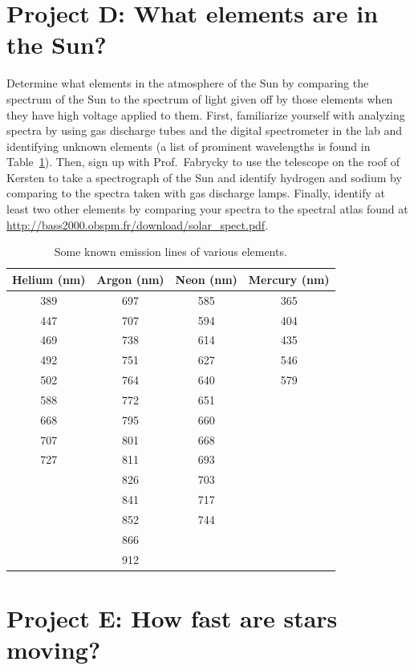 \section{Project D: What elements are in the Sun?}

Determine what elements in the atmosphere of the Sun by comparing the spectrum of the Sun to the spectrum of light given off by those elements when they have high voltage applied to them. First, familiarize yourself with analyzing spectra by using gas discharge tubes and the digital spectrometer in the lab and identifying unknown elements (a list of prominent wavelengths is found in Table\ \ref{sp:tab:emissions}). Then, sign up with Prof.\ Fabrycky to use the telescope on the roof of Kersten to take a spectrograph of the Sun and identify hydrogen and sodium by comparing to the spectra taken with gas discharge lamps. Finally, identify at least two other elements by comparing your spectra to the spectral atlas found at \url{http://bass2000.obspm.fr/download/solar_spect.pdf}.

\begin{table}
	\centering
	\begin{tabular}{c|c|c|c}
		\toprule
		\textbf{Helium (nm)} & \textbf{Argon (nm)} & \textbf{Neon (nm)} & \textbf{Mercury (nm)} \\ \midrule
		389 & 697 & 585 & 365 \\
		447 & 707 & 594 & 404 \\
		469 & 738 & 614 & 435 \\
		492 & 751 & 627 & 546 \\
		502 & 764 & 640 & 579 \\
		588 & 772 & 651 & \\
		668 & 795 & 660 & \\
		707 & 801 & 668 & \\
		727 & 811 & 693 & \\
		& 826 & 703 & \\
		& 841 & 717 & \\
		& 852 & 744 & \\
		& 866 & & \\
		& 912 & & \\ \bottomrule
	\end{tabular}
	\caption{Some known emission lines of various elements.}\label{sp:tab:emissions}
\end{table}

\section{Project E: How fast are stars moving?}

